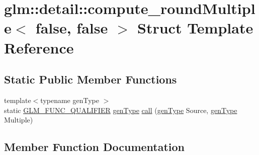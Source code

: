 \hypertarget{structglm_1_1detail_1_1compute__round_multiple_3_01false_00_01false_01_4}{}\section{glm\+:\+:detail\+:\+:compute\+\_\+round\+Multiple$<$ false, false $>$ Struct Template Reference}
\label{structglm_1_1detail_1_1compute__round_multiple_3_01false_00_01false_01_4}
\subsection*{Static Public Member Functions}
\begin{DoxyCompactItemize}
\item 
{\footnotesize template$<$typename gen\+Type $>$ }\\static \mbox{\hyperlink{setup_8hpp_a33fdea6f91c5f834105f7415e2a64407}{G\+L\+M\+\_\+\+F\+U\+N\+C\+\_\+\+Q\+U\+A\+L\+I\+F\+I\+ER}} \mbox{\hyperlink{structglm_1_1detail_1_1gen_type}{gen\+Type}} \mbox{\hyperlink{structglm_1_1detail_1_1compute__round_multiple_3_01false_00_01false_01_4_a9242ffccd610779b8020ad382d47213a}{call}} (\mbox{\hyperlink{structglm_1_1detail_1_1gen_type}{gen\+Type}} Source, \mbox{\hyperlink{structglm_1_1detail_1_1gen_type}{gen\+Type}} Multiple)
\end{DoxyCompactItemize}


\subsection{Member Function Documentation}
\mbox{\label{structglm_1_1detail_1_1compute__round_multiple_3_01false_00_01false_01_4_a9242ffccd610779b8020ad382d47213a}} 
